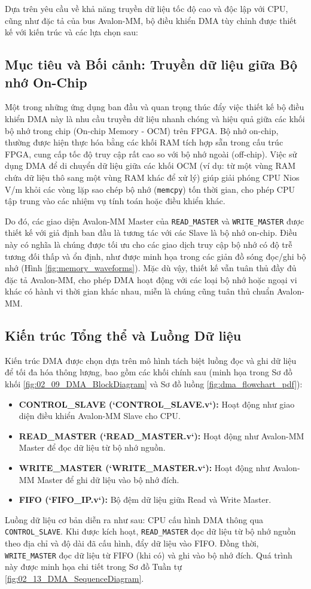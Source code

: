 Dựa trên yêu cầu về khả năng truyền dữ liệu tốc độ cao và độc lập với CPU, cũng như đặc tả của bus Avalon-MM, bộ điều khiển DMA tùy chỉnh được thiết kế với kiến trúc và các lựa chọn sau:

\subsection{Mục tiêu và Bối cảnh: Truyền dữ liệu giữa Bộ nhớ On-Chip}
\label{subsec:dma_context_onchip}
Một trong những ứng dụng ban đầu và quan trọng thúc đẩy việc thiết kế bộ điều khiển DMA này là nhu cầu truyền dữ liệu nhanh chóng và hiệu quả giữa các khối bộ nhớ trong chip (On-chip Memory - OCM) trên FPGA. Bộ nhớ on-chip, thường được hiện thực hóa bằng các khối RAM tích hợp sẵn trong cấu trúc FPGA, cung cấp tốc độ truy cập rất cao so với bộ nhớ ngoài (off-chip). Việc sử dụng DMA để di chuyển dữ liệu giữa các khối OCM (ví dụ: từ một vùng RAM chứa dữ liệu thô sang một vùng RAM khác để xử lý) giúp giải phóng CPU Nios V/m khỏi các vòng lặp sao chép bộ nhớ (\texttt{memcpy}) tốn thời gian, cho phép CPU tập trung vào các nhiệm vụ tính toán hoặc điều khiển khác.

Do đó, các giao diện Avalon-MM Master của \texttt{READ\_MASTER} và \texttt{WRITE\_MASTER} được thiết kế với giả định ban đầu là tương tác với các Slave là bộ nhớ on-chip. Điều này có nghĩa là chúng được tối ưu cho các giao dịch truy cập bộ nhớ có độ trễ tương đối thấp và ổn định, như được minh họa trong các giản đồ sóng đọc/ghi bộ nhớ (Hình \ref{fig:memory_waveforms}). Mặc dù vậy, thiết kế vẫn tuân thủ đầy đủ đặc tả Avalon-MM, cho phép DMA hoạt động với các loại bộ nhớ hoặc ngoại vi khác có hành vi thời gian khác nhau, miễn là chúng cũng tuân thủ chuẩn Avalon-MM.

\subsection{Kiến trúc Tổng thể và Luồng Dữ liệu}
Kiến trúc DMA được chọn dựa trên mô hình tách biệt luồng đọc và ghi dữ liệu để tối đa hóa thông lượng, bao gồm các khối chính sau (minh họa trong Sơ đồ khối \ref{fig:02_09_DMA_BlockDiagram} và Sơ đồ luồng \ref{fig:dma_flowchart_pdf}):
\begin{itemize}
    \item \textbf{CONTROL\_SLAVE (`CONTROL\_SLAVE.v`):} Hoạt động như giao diện điều khiển Avalon-MM Slave cho CPU.
    \item \textbf{READ\_MASTER (`READ\_MASTER.v`):} Hoạt động như Avalon-MM Master để đọc dữ liệu từ bộ nhớ nguồn.
    \item \textbf{WRITE\_MASTER (`WRITE\_MASTER.v`):} Hoạt động như Avalon-MM Master để ghi dữ liệu vào bộ nhớ đích.
    \item \textbf{FIFO (`FIFO\_IP.v`):} Bộ đệm dữ liệu giữa Read và Write Master.
\end{itemize}
Luồng dữ liệu cơ bản diễn ra như sau: CPU cấu hình DMA thông qua \texttt{CONTROL\_SLAVE}. Khi được kích hoạt, \texttt{READ\_MASTER} đọc dữ liệu từ bộ nhớ nguồn theo địa chỉ và độ dài đã cấu hình, đẩy dữ liệu vào FIFO. Đồng thời, \texttt{WRITE\_MASTER} đọc dữ liệu từ FIFO (khi có) và ghi vào bộ nhớ đích. Quá trình này được minh họa chi tiết trong Sơ đồ Tuần tự \ref{fig:02_13_DMA_SequenceDiagram}.

